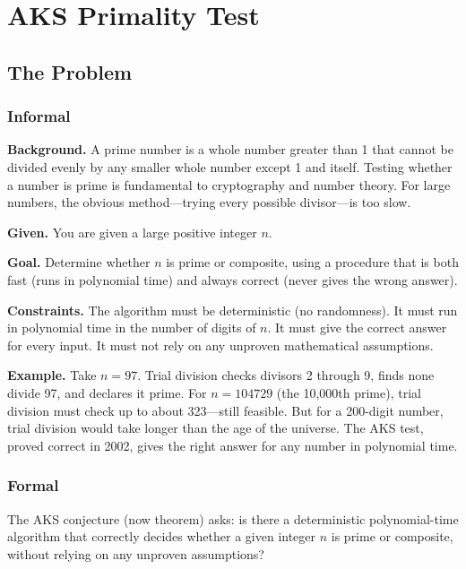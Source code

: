\let\LocalMacro\relax

\chapter{AKS Primality Test}

\section{The Problem}

\subsection{Informal}

\textbf{Background.} A prime number is a whole number greater than 1 that cannot be divided evenly by any smaller whole number except 1 and itself. Testing whether a number is prime is fundamental to cryptography and number theory. For large numbers, the obvious method---trying every possible divisor---is too slow.

\textbf{Given.} You are given a large positive integer $n$.

\textbf{Goal.} Determine whether $n$ is prime or composite, using a procedure that is both fast (runs in polynomial time) and always correct (never gives the wrong answer).

\textbf{Constraints.} The algorithm must be deterministic (no randomness). It must run in polynomial time in the number of digits of $n$. It must give the correct answer for every input. It must not rely on any unproven mathematical assumptions.

\textbf{Example.} Take $n = 97$. Trial division checks divisors 2 through 9, finds none divide 97, and declares it prime. For $n = 104729$ (the 10,000th prime), trial division must check up to about 323---still feasible. But for a 200-digit number, trial division would take longer than the age of the universe. The AKS test, proved correct in 2002, gives the right answer for any number in polynomial time.

\subsection{Formal}
The AKS conjecture (now theorem) asks: is there a deterministic polynomial-time algorithm that correctly decides whether a given integer $n$ is prime or composite, without relying on any unproven assumptions?

